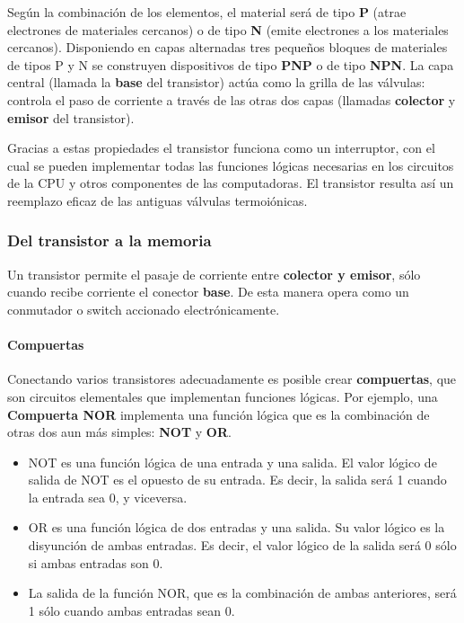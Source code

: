 \documentclass[spanish,A4,]{article}
\begin{document}
Según la combinación de los elementos, el material será de tipo
\textbf{P} (atrae electrones de materiales cercanos) o de tipo
\textbf{N} (emite electrones a los materiales cercanos). Disponiendo en
capas alternadas tres pequeños bloques de materiales de tipos P y N se
construyen dispositivos de tipo \textbf{PNP} o de tipo \textbf{NPN}. La
capa central (llamada la \textbf{base} del transistor) actúa como la
grilla de las válvulas: controla el paso de corriente a través de las
otras dos capas (llamadas \textbf{colector} y \textbf{emisor} del
transistor).

Gracias a estas propiedades el transistor funciona como un interruptor,
con el cual se pueden implementar todas las funciones lógicas necesarias
en los circuitos de la CPU y otros componentes de las computadoras. El
transistor resulta así un reemplazo eficaz de las antiguas válvulas
termoiónicas.

\subsubsection{Del transistor a la
memoria}\label{del-transistor-a-la-memoria}

Un transistor permite el pasaje de corriente entre \textbf{colector y
emisor}, sólo cuando recibe corriente el conector \textbf{base}. De esta
manera opera como un conmutador o switch accionado electrónicamente.

\paragraph{Compuertas}\label{compuertas}

Conectando varios transistores adecuadamente es posible crear
\textbf{compuertas}, que son circuitos elementales que implementan
funciones lógicas. Por ejemplo, una \textbf{Compuerta NOR} implementa
una función lógica que es la combinación de otras dos aun más simples:
\textbf{NOT} y \textbf{OR}.

\begin{itemize}
\itemsep1pt\parskip0pt
\item
  NOT es una función lógica de una entrada y una salida. El valor lógico
  de salida de NOT es el opuesto de su entrada. Es decir, la salida será
  1 cuando la entrada sea 0, y viceversa.
\item
  OR es una función lógica de dos entradas y una salida. Su valor lógico
  es la disyunción de ambas entradas. Es decir, el valor lógico de la
  salida será 0 sólo si ambas entradas son 0.
\item
  La salida de la función NOR, que es la combinación de ambas
  anteriores, será 1 sólo cuando ambas entradas sean 0.
\end{itemize}
\end{document}
